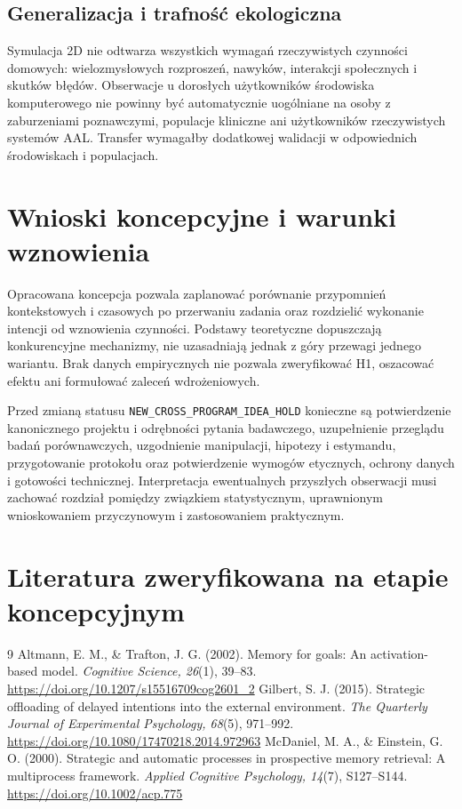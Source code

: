 \documentclass[11pt,a4paper]{article}
\begin{document}
\subsection{Generalizacja i trafność ekologiczna}
Symulacja 2D nie odtwarza wszystkich wymagań rzeczywistych czynności domowych: wielozmysłowych rozproszeń, nawyków, interakcji społecznych i skutków błędów. Obserwacje u dorosłych użytkowników środowiska komputerowego nie powinny być automatycznie uogólniane na osoby z zaburzeniami poznawczymi, populacje kliniczne ani użytkowników rzeczywistych systemów AAL. Transfer wymagałby dodatkowej walidacji w odpowiednich środowiskach i populacjach.

\section{Wnioski koncepcyjne i warunki wznowienia}
Opracowana koncepcja pozwala zaplanować porównanie przypomnień kontekstowych i czasowych po przerwaniu zadania oraz rozdzielić wykonanie intencji od wznowienia czynności. Podstawy teoretyczne dopuszczają konkurencyjne mechanizmy, nie uzasadniają jednak z góry przewagi jednego wariantu. Brak danych empirycznych nie pozwala zweryfikować H1, oszacować efektu ani formułować zaleceń wdrożeniowych.

Przed zmianą statusu \texttt{NEW\_CROSS\_PROGRAM\_IDEA\_HOLD} konieczne są potwierdzenie kanonicznego projektu i odrębności pytania badawczego, uzupełnienie przeglądu badań porównawczych, uzgodnienie manipulacji, hipotezy i estymandu, przygotowanie protokołu oraz potwierdzenie wymogów etycznych, ochrony danych i gotowości technicznej. Interpretacja ewentualnych przyszłych obserwacji musi zachować rozdział pomiędzy związkiem statystycznym, uprawnionym wnioskowaniem przyczynowym i zastosowaniem praktycznym.

\section*{Literatura zweryfikowana na etapie koncepcyjnym}
\begin{thebibliography}{9}
 Altmann, E. M., \& Trafton, J. G. (2002). Memory for goals: An activation-based model. \textit{Cognitive Science, 26}(1), 39--83. \url{https://doi.org/10.1207/s15516709cog2601_2}
 Gilbert, S. J. (2015). Strategic offloading of delayed intentions into the external environment. \textit{The Quarterly Journal of Experimental Psychology, 68}(5), 971--992. \url{https://doi.org/10.1080/17470218.2014.972963}
 McDaniel, M. A., \& Einstein, G. O. (2000). Strategic and automatic processes in prospective memory retrieval: A multiprocess framework. \textit{Applied Cognitive Psychology, 14}(7), S127--S144. \url{https://doi.org/10.1002/acp.775}
\end{thebibliography}
\end{document}
